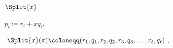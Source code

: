 \begin{block}{$\Split{x}$}
    \begin{minipage}{0.57\linewidth}
        $p_i \coloneqq r_i + x q_i$.

        $\Split{x}(\pi) \coloneqq (r_1, q_1, r_2, q_2, r_3, q_3, \dots, r_{\ell}, q_{\ell})$.
    \end{minipage}
    \begin{minipage}{0.1\linewidth}
        \centering
    \end{minipage}
\end{block}